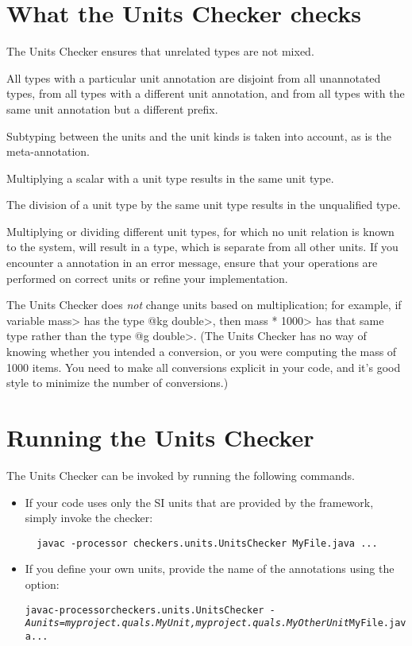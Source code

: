 \section{What the Units Checker checks\label{units-checks}}

The Units Checker ensures that unrelated types are not mixed. 

All types with a particular unit annotation are
disjoint from all unannotated types, from all types with a different unit
annotation, and from all types with the same unit annotation but a
different prefix.

Subtyping between the units and the unit kinds is taken into account,
as is the  meta-annotation.

Multiplying a scalar with a unit type results in the same unit type.

The division of a unit type by the same unit type
results in the unqualified type.

Multiplying or dividing different unit types, for which no unit
relation is known to the system, will result in a 
type, which is separate from all other units.
If you encounter a  annotation in an error message,
ensure that your operations are performed on correct units or refine
your  implementation.

The Units Checker does \emph{not} change units based on multiplication; for
example, if variable \<mass> has the type \<@kg double>, then \<mass *
1000> has that same type rather than the type \<@g double>.  (The Units
Checker has no way of knowing whether you intended a conversion, or you
were computing the mass of 1000 items.  You need to make all conversions
explicit in your code, and it's good style to minimize the number of
conversions.)


\section{Running the Units Checker\label{units-running}}

The Units Checker can be invoked by running the following commands.

\begin{itemize}
\item
If your code uses only the SI units that are provided by the
framework, simply invoke the checker:

\begin{Verbatim}
  javac -processor checkers.units.UnitsChecker MyFile.java ...
\end{Verbatim}

\item 
If you define your own units, provide the name of the annotations using the
 option:

\begin{alltt}
  javac -processor checkers.units.UnitsChecker \
        \textit{-Aunits=myproject.quals.MyUnit,myproject.quals.MyOtherUnit} MyFile.java ...
\end{alltt}
\end{itemize}



